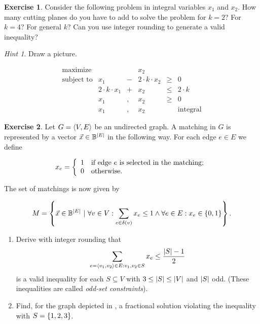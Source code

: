 \documentclass[titlepage]{book}
\makeatletter
\newcommand{\concept}[1]{\toindex{#1}\indexlayout{#1}}
\newcommand{\indexlayout}[1]{\emph{#1}}
\newcommand\toindex{\@ifstar{\@dblarg{\@toindexs}}{\@toindex}}
\def\@toindexs[#1]#2{\index{#1@#2}}
\newcommand\@toindex[2][]{%
  \if\relax\detokenize{#1}\relax
    \begingroup
    \@splitword#2\@nil%
    \uppercase\expandafter{%
      \expandafter\def\expandafter\@initial\expandafter{\@first}}%
    \toks0=\expandafter{\@initial}%
    \toks2=\expandafter{\@rest}%
    \edef\x{\endgroup\noexpand\index{\the\toks0 \the\toks2 }}\x
  \else
    \index{#1}
  \fi
}
\def\@splitword#1#2\@nil{\def\@first{#1}\def\@rest{#2}}
\theoremstyle{plain}
\theoremstyle{definition}
\newtheorem{exercise}{Exercise}[chapter]
\theoremstyle{remark}
\newtheorem{hint}{Hint}
\makeatother
\begin{document}
\begin{exercise}
Consider the following problem in integral variables $x_1$ and $x_2$. How many cutting planes do you have to add to solve the problem for $k=2$? For $k=4$? For general $k$? Can you use integer rounding to generate a valid inequality?
\begin{hint}
Draw a picture.
\end{hint}
\begin{equation}
\begin{array}{rrcrcr}
\mbox{maximize}&&&x_2\\
\mbox{subject to}&x_1&-&2\cdot k\cdot x_2&\geq&0\\
&2\cdot k\cdot x_1&+&x_2&\leq&2\cdot k\\
&x_1&,&x_2&\geq&0\\
&x_1&,&x_2&&\mbox{integral}
\end{array}
\end{equation}
\end{exercise}
\begin{exercise}
Let $G=\tupl{V,E}$ be an undirected graph. A matching in $G$ is represented by a vector $\vec{x}\in\BoolSet^{\abs{E}}$ in the following way. For each edge $e\in E$ we define

\begin{equation}
\semboolvar{x_e}{if edge $e$ is selected in the matching;}{otherwise.}
\end{equation}

The set of matchings is now given by

\begin{equation}
M=\condset{\vec{x}\in\BoolSet^{|E|}}{\forall v\in V:\sumdomain[e]{\fun{\delta}{v}}{x_e}\leq 1\wedge\forall e\in E:x_e\in\accl{0,1}}.
\end{equation}

\begin{enumerate}
 \item Derive with integer rounding that
\begin{equation}
\sumdomain[e=\tupl{v_1,v_2}]{E:v_1,v_2\in S}{x_e}\leq\displaystyle\frac{\abs{S}-1}{2}
\eqnlab{matching-introunding}
\end{equation}
is a valid inequality for each $S\subseteq V$ with $3\leq\abs{S}\leq\abs{V}$ and $\abs{S}$ odd. (These inequalities are called \concept{odd-set constraints}).
 \item Find, for the graph depicted in , a fractional solution violating the inequality  with $S=\accl{1,2,3}$.
\end{enumerate}
\end{exercise}
\end{document}
